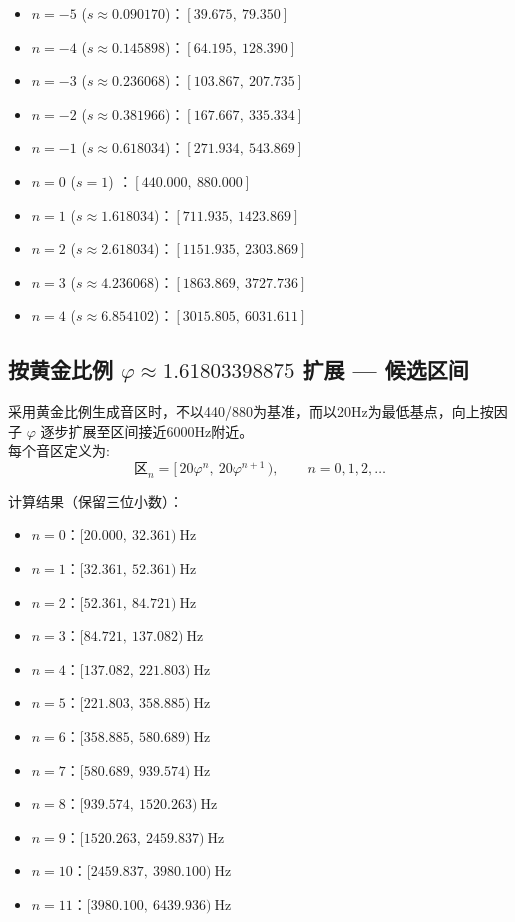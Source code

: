 \documentclass{article}
\begin{document}
\begin{itemize}
  \item $n=-5$ ($s\approx0.090170$)：$[39.675,\ 79.350]$
  \item $n=-4$ ($s\approx0.145898$)：$[64.195,\ 128.390]$
  \item $n=-3$ ($s\approx0.236068$)：$[103.867,\ 207.735]$
  \item $n=-2$ ($s\approx0.381966$)：$[167.667,\ 335.334]$
  \item $n=-1$ ($s\approx0.618034$)：$[271.934,\ 543.869]$
  \item $n=0$  ($s=1$)          ：$[440.000,\ 880.000]$
  \item $n=1$  ($s\approx1.618034$)：$[711.935,\ 1423.869]$
  \item $n=2$  ($s\approx2.618034$)：$[1151.935,\ 2303.869]$
  \item $n=3$  ($s\approx4.236068$)：$[1863.869,\ 3727.736]$
  \item $n=4$  ($s\approx6.854102$)：$[3015.805,\ 6031.611]$
\end{itemize}

\subsection{按黄金比例 \(\varphi\approx1.61803398875\) 扩展 — 候选区间}
采用黄金比例生成音区时，不以440/880为基准，而以20Hz为最低基点，向上按因子 \(\varphi\) 逐步扩展至区间接近6000Hz附近。
\\每个音区定义为:
\[
\text{区}_n = \big[\,20\varphi^{n},\ 20\varphi^{n+1}\,\big),\qquad n=0,1,2,\dots
\]

计算结果（保留三位小数）：
\begin{itemize}
  \item $n=0$：$[20.000,\ 32.361)\ \mathrm{Hz}$
  \item $n=1$：$[32.361,\ 52.361)\ \mathrm{Hz}$
  \item $n=2$：$[52.361,\ 84.721)\ \mathrm{Hz}$
  \item $n=3$：$[84.721,\ 137.082)\ \mathrm{Hz}$
  \item $n=4$：$[137.082,\ 221.803)\ \mathrm{Hz}$
  \item $n=5$：$[221.803,\ 358.885)\ \mathrm{Hz}$
  \item $n=6$：$[358.885,\ 580.689)\ \mathrm{Hz}$
  \item $n=7$：$[580.689,\ 939.574)\ \mathrm{Hz}$
  \item $n=8$：$[939.574,\ 1520.263)\ \mathrm{Hz}$
  \item $n=9$：$[1520.263,\ 2459.837)\ \mathrm{Hz}$
  \item $n=10$：$[2459.837,\ 3980.100)\ \mathrm{Hz}$
  \item $n=11$：$[3980.100,\ 6439.936)\ \mathrm{Hz}$
\end{itemize}
\end{document}
